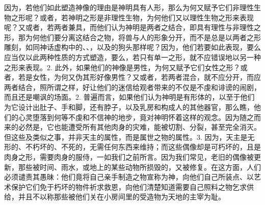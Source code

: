 因为，若他们如此塑造神像的理由是神明具有人形，那么为何又赋予它们非理性生物之形呢？或者，若神明之形是非理性生物，为何他们又以理性生物之形来表现呢？又或者，若两者兼具，而他们认为神明是两者之结合，即具有理性与非理性之形，那为何他们要分离这结合之物，将兽与人的形象分开，而不是总是以两者之形雕刻，如同神话虚构中的、、，以及的狗头那样呢？因为，他们若要如此表现，要么应当仅以此两种性质的方式塑造，要么，若只有单一之形，就不应错误地以另一种之形来表现。\newline{}2. 此外，如果他们的神像是男性，为何又赋予它们女性之形？或者，若是女性，为何又伪其形好像男性？又或者，若两者混合，就不应分开，而应两者结合，照所谓之样，好让他们的迷信给观者带来的不仅是不虔和诽谤的闹剧，而且还是嘲讽的场面。\newline{}2. 普遍而言，如果他们认为神明是有形体的，以至于他们为它设计出肚子、手和脚，还有脖子，以及乳房和构成人的其他器官，那么瞧，他们的心灵堕落到何等不虔和不信神的地步，竟对神明怀着这样的观念。因为随之而来的必然是，它也能遭受所有其他肉身的灾难，能被切割、分裂，甚至完全消灭。但这些及类似之事，并非天主的属性，而是属世之物的属性。\newline{}3. 因为，天主是无形的、不朽坏的、不死的，无需任何东西来维持；而这些偶像却是可朽坏的，且是肉身之形，需要肉身的服侍，一如我们之前所言。因为我们常见，老旧的偶像被更新，那些被时间、雨水，或地上的某些动物所损毁的，又被修复。在这方面，人们必须谴责其愚昧：他们竟将自己亲手制造之物宣称为神，向他们自己所装点、以艺术保护它们免于朽坏的物件祈求救恩，向他们清楚知道需要自己照料之物乞求供给，并且不以称那些被他们关在小房间里的受造物为天地的主宰为耻。\par

\par

